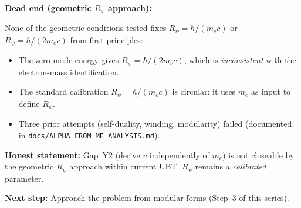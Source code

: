 \documentclass[12pt,a4paper]{article}
\theoremstyle{definition}
\theoremstyle{remark}
\begin{document}
\begin{deadendbox}
\textbf{Dead end (geometric $R_\psi$ approach):}

None of the geometric conditions tested fixes $R_\psi = \hbar/(m_e c)$
or $R_\psi = \hbar/(2m_e c)$ from first principles:
\begin{itemize}
  \item The zero-mode energy gives $R_\psi = \hbar/(2m_e c)$, which is
        \emph{inconsistent} with the electron-mass identification.
  \item The standard calibration $R_\psi = \hbar/(m_e c)$ is circular:
        it uses $m_e$ as input to define $R_\psi$.
  \item Three prior attempts (self-duality, winding, modularity) failed
        (documented in \texttt{docs/ALPHA\_FROM\_ME\_ANALYSIS.md}).
\end{itemize}

\textbf{Honest statement:}
Gap~Y2 (derive $v$ independently of $m_e$) is not closeable by the
geometric $R_\psi$ approach within current UBT.  $R_\psi$ remains a
\emph{calibrated} parameter.

\textbf{Next step:} Approach the problem from modular forms
(Step~3 of this series).
\end{deadendbox}

\ifdefined\INCLUDEMODE
\else
  
\end{document}
